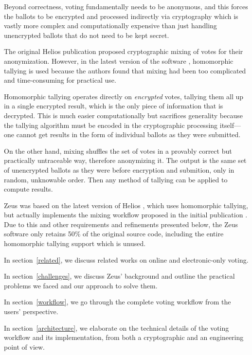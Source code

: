 \documentclass[letterpaper,twocolumn,10pt]{article}
\begin{document}
Beyond correctness, voting fundamentally needs to be anonymous,
and this forces the ballots to be encrypted and processed indirectly
via cryptography which is vastly more complex and computationally
expensive than just handling unencrypted ballots that do not need
to be kept secret.

The original Helios publication \cite{HeliosOriginal} proposed
cryptographic mixing \cite{Mixnet} of votes for their anonymization.
However, in the latest version of the software \cite{Helios3},
homomorphic tallying \cite{Homomorphic} is used because the authors
found that mixing had been too complicated and time-consuming for
practical use.

Homomorphic tallying operates directly on \emph{encrypted} votes,
tallying them all up in a single encrypted result, which is the only
piece of information that is decrypted.
This is much easier computationally but sacrifices generality because
the tallying algorithm must be encoded in the cryptographic processing
itself---one cannot get results in the form of individual ballots as
they were submitted.

On the other hand, mixing shuffles the set of votes in a provably
correct but practically untraceable way, therefore anonymizing it.
The output is the same set of unencrypted ballots as they were before
encryption and submition, only in random, unknowable order.
Then any method of tallying can be applied to compute results.

Zeus was based on the latest version of Helios \cite{HeliosCode}, 
which uses homomorphic tallying, but actually implements the mixing
workflow proposed in the initial publication \cite{HeliosOriginal}.
Due to this and other requirements and refinements presented below,
the Zeus software only retains 50\% of the original source code,
including the entire homomorphic tallying support which is unused.

In section~\ref{related},
we discuss related works on online and electronic-only voting.

In section~\ref{challenges},
we discuss Zeus' background and outline the practical problems we faced
and our approach to solve them.

In section~\ref{workflow},
we go through the complete voting workflow from the users' perspective.

In section~\ref{architecture},
we elaborate on the technical details of the voting workflow and its
implementation, from both a cryptographic and an engineering point of
view.
\end{document}
